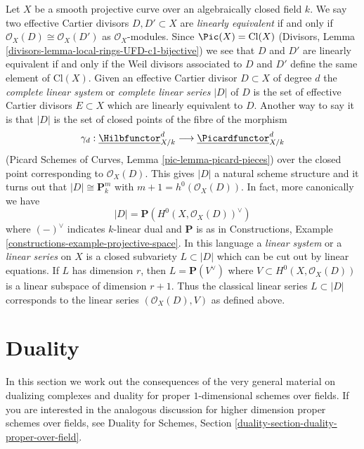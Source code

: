 \begin{remark}
\label{remark-classical-linear-series}
Let $X$ be a smooth projective curve over an algebraically closed field $k$.
We say two effective Cartier divisors $D, D' \subset X$ are
{\it linearly equivalent} if and only if
$\mathcal{O}_X(D) \cong \mathcal{O}_X(D')$ as $\mathcal{O}_X$-modules.
Since $\Pic(X) = \text{Cl}(X)$
(Divisors, Lemma \ref{divisors-lemma-local-rings-UFD-c1-bijective})
we see that $D$ and $D'$ are linearly equivalent
if and only if the Weil divisors associated to
$D$ and $D'$ define the same element of $\text{Cl}(X)$.
Given an effective Cartier divisor $D \subset X$ of degree $d$ the
{\it complete linear system} or {\it complete linear series} $|D|$ of $D$
is the set of effective Cartier divisors $E \subset X$
which are linearly equivalent to $D$.
Another way to say it is that $|D|$ is the set of closed
points of the fibre of the morphism
$$
\gamma_d :
\underline{\Hilbfunctor}^d_{X/k}
\longrightarrow
\underline{\Picardfunctor}^d_{X/k}
$$
(Picard Schemes of Curves, Lemma \ref{pic-lemma-picard-pieces})
over the closed point corresponding to $\mathcal{O}_X(D)$.
This gives $|D|$ a natural scheme structure and it
turns out that $|D| \cong \mathbf{P}^m_k$ with
$m + 1 = h^0(\mathcal{O}_X(D))$. In fact, more canonically we have
$$
|D| = \mathbf{P}(H^0(X, \mathcal{O}_X(D))^\vee)
$$
where $(-)^\vee$ indicates $k$-linear dual and $\mathbf{P}$ is as
in Constructions, Example \ref{constructions-example-projective-space}.
In this language a {\it linear system} or a {\it linear series} on
$X$ is a closed subvariety $L \subset |D|$ which can be cut out by
linear equations. If $L$ has dimension $r$, then $L = \mathbf{P}(V^\vee)$
where $V \subset H^0(X, \mathcal{O}_X(D))$ is a linear subspace
of dimension $r + 1$. Thus the classical linear series
$L \subset |D|$ corresponds to the linear series $(\mathcal{O}_X(D), V)$
as defined above.
\end{remark}







\section{Duality}
\label{section-duality}

\noindent
In this section we work out the consequences of the very general
material on dualizing complexes and duality for proper $1$-dimensional
schemes over fields. If you are interested in the analogous discussion
for higher dimension proper schemes over fields, see
Duality for Schemes, Section \ref{duality-section-duality-proper-over-field}.

